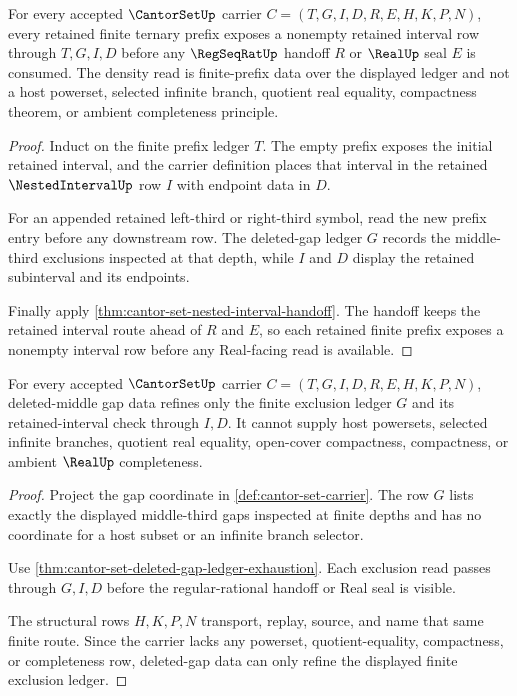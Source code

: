 \begin{theorem}
\label{thm:cantor-set-ternary-prefix-density}
For every accepted $\CantorSetUp$ carrier $C=(T,G,I,D,R,E,H,K,P,N)$, every retained finite ternary prefix exposes a nonempty retained interval row through $T,G,I,D$ before any $\RegSeqRatUp$ handoff $R$ or $\RealUp$ seal $E$ is consumed. The density read is finite-prefix data over the displayed ledger and not a host powerset, selected infinite branch, quotient real equality, compactness theorem, or ambient completeness principle.
\end{theorem}
\begin{proof}
Induct on the finite prefix ledger $T$. The empty prefix exposes the initial retained interval, and the carrier definition places that interval in the retained $\NestedIntervalUp$ row $I$ with endpoint data in $D$.

For an appended retained left-third or right-third symbol, read the new prefix entry before any downstream row. The deleted-gap ledger $G$ records the middle-third exclusions inspected at that depth, while $I$ and $D$ display the retained subinterval and its endpoints.

Finally apply \autoref{thm:cantor-set-nested-interval-handoff}. The handoff keeps the retained interval route ahead of $R$ and $E$, so each retained finite prefix exposes a nonempty interval row before any Real-facing read is available.
\end{proof}

\begin{theorem}
\label{thm:cantor-set-deleted-gap-density-refusal}
For every accepted $\CantorSetUp$ carrier $C=(T,G,I,D,R,E,H,K,P,N)$, deleted-middle gap data refines only the finite exclusion ledger $G$ and its retained-interval check through $I,D$. It cannot supply host powersets, selected infinite branches, quotient real equality, open-cover compactness, compactness, or ambient $\RealUp$ completeness.
\end{theorem}
\begin{proof}
Project the gap coordinate in \autoref{def:cantor-set-carrier}. The row $G$ lists exactly the displayed middle-third gaps inspected at finite depths and has no coordinate for a host subset or an infinite branch selector.

Use \autoref{thm:cantor-set-deleted-gap-ledger-exhaustion}. Each exclusion read passes through $G,I,D$ before the regular-rational handoff or Real seal is visible.

The structural rows $H,K,P,N$ transport, replay, source, and name that same finite route. Since the carrier lacks any powerset, quotient-equality, compactness, or completeness row, deleted-gap data can only refine the displayed finite exclusion ledger.
\end{proof}

